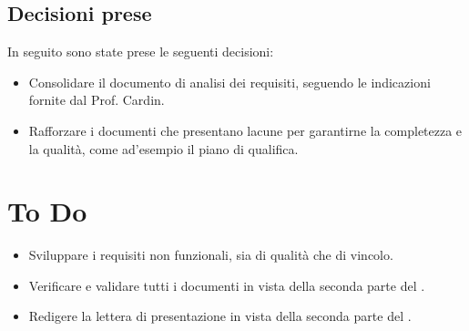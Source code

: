 \documentclass[a4paper, 12pt]{article}
\begin{document}
\subsection{Decisioni prese}
In seguito sono state prese le seguenti decisioni:
\begin{itemize}
    \item Consolidare il documento di analisi dei requisiti, seguendo le indicazioni fornite dal Prof. Cardin.
    \item Rafforzare i documenti che presentano lacune per garantirne la completezza e la qualità, come ad'esempio il piano di qualifica.
\end{itemize}

\section{To Do}
\begin{itemize}
    \item Sviluppare i requisiti non funzionali, sia di qualità che di vincolo.
    \item Verificare e validare tutti i documenti in vista della seconda parte del .
    \item Redigere la lettera di presentazione in vista della seconda parte del .
\end{itemize}
\end{document}
